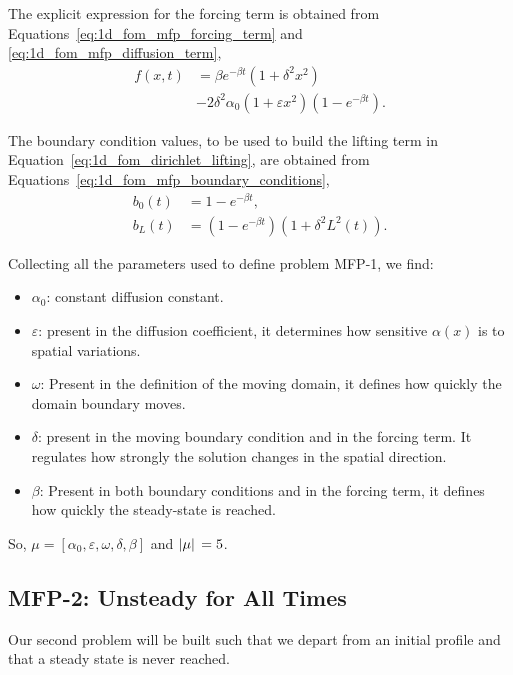 \documentclass[../main.tex]{subfiles}
\begin{document}
The explicit expression for the forcing term is obtained from Equations~\eqref{eq:1d_fom_mfp_forcing_term} and \eqref{eq:1d_fom_mfp_diffusion_term},
\begin{equation}
    \begin{split}
        f(x,t) &= \beta e^{-\beta t} (1+\delta^2 x^2) \\
        &- 2 \delta^2 \alpha_0(1 + \varepsilon x^2) \left(1 - e^{-\beta t}\right).    
    \end{split}
\end{equation}

The boundary condition values, to be used to build the lifting term in Equation~\eqref{eq:1d_fom_dirichlet_lifting}, are obtained from Equations~\eqref{eq:1d_fom_mfp_boundary_conditions},
\begin{subequations}
    \begin{align}
        b_0(t) &= 1 - e^{-\beta t}, \\
        b_L(t) &= \left(1 - e^{-\beta t}\right)\left(1 + \delta^2 L^{2}(t)\right).
    \end{align}
\end{subequations}

Collecting all the parameters used to define problem MFP-1, we find:
\begin{itemize}
    \item $\alpha_0$: constant diffusion constant. 
    \item $\varepsilon$: present in the diffusion coefficient, it determines how sensitive $\alpha(x)$ is to spatial variations. 
    \item $\omega$: Present in the definition of the moving domain, it defines how quickly the domain boundary moves.
    \item $\delta$: present in the moving boundary condition and in the forcing term. 
    It regulates how strongly the solution changes in the spatial direction.
    \item $\beta$: Present in both boundary conditions and in the forcing term, it defines how quickly the steady-state is reached.
\end{itemize}
So, $\mu = [\alpha_0, \varepsilon, \omega, \delta, \beta]$ and $\abs*{\mu} = 5$.

\subsection{MFP-2: Unsteady for All Times}
Our second problem will be built such that we depart from an initial profile and that a steady state is never reached. 
\end{document}
